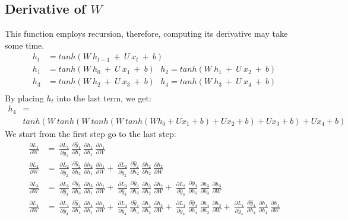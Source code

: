 \documentclass{article}
\begin{document}
\subsection{Derivative of $W$}
This function employs recursion, therefore, computing its derivative may take some time.
\begin{align*}
	h_t &= tanh(W ~h_{t-1}~+~U~x_t ~+~b)\\
	h_1 & = tanh(W ~h_{0}~+~U~x_1 ~+~b) ~~~ h_2 = tanh(W ~h_{1}~+~U~x_2 ~+~b)\\
	h_3 &= tanh(W ~h_{2}~+~U~x_3 ~+~b)~~~h_4 = tanh(W ~h_{3}~+~U~x_4 ~+~b)\\
\end{align*}
By placing $h_t$ into the last term, we get:
\begin{align*}
	h_4 &= \\
	& tanh(W ~tanh(W ~tanh(W ~tanh(W h_{0}+Ux_1 +b)+Ux_2 +b)+Ux_3 +b) +Ux_4 +b)
\end{align*}
We start from the first step go to the last step:
\begin{align*}
\frac{\partial L_1}{ \partial{W}} & = ~\frac{\partial L_1}{ \partial \hat{y}_1}~\frac{\partial \hat{y}_1}{ \partial h_1}
 ~\frac{\partial h_1}{ \partial h_1} ~\frac{\partial h_1}{ \partial W} \\
	\frac{\partial L_2}{ \partial{W}} & = ~\frac{\partial L_2}{ \partial \hat{y}_2}~\frac{\partial \hat{y}_2}{ \partial h_2}
 ~\frac{\partial h_2}{ \partial h_1} ~\frac{\partial h_1}{ \partial W}	+ ~\frac{\partial L_2}{ \partial \hat{y}_2}~\frac{\partial \hat{y}_2}{ \partial h_2}
 ~\frac{\partial h_2}{ \partial h_2} ~\frac{\partial h_2}{ \partial W} \\
 \frac{\partial L_3}{ \partial{W}} & = ~\frac{\partial L_3}{ \partial \hat{y}_3}~\frac{\partial \hat{y}_3}{ \partial h_3}
 ~\frac{\partial h_3}{ \partial h_1} ~\frac{\partial h_1}{ \partial W}	+ ~\frac{\partial L_3}{ \partial \hat{y}_3}~\frac{\partial \hat{y}_3}{ \partial h_3}
 ~\frac{\partial h_3}{ \partial h_2} ~\frac{\partial h_2}{ \partial W} +  ~\frac{\partial L_3}{ \partial \hat{y}_3}~\frac{\partial \hat{y}_3}{ \partial h_3}
 ~\frac{\partial h_3}{ \partial h_3} ~\frac{\partial h_3}{ \partial W} \\
 \frac{\partial L_4}{ \partial{W}} & = ~\frac{\partial L_4}{ \partial \hat{y}_4}~\frac{\partial \hat{y}_4}{ \partial h_4}
 ~\frac{\partial h_4}{ \partial h_1} ~\frac{\partial h_1}{ \partial W}	+ ~\frac{\partial L_4}{ \partial \hat{y}_4}~\frac{\partial \hat{y}_4}{ \partial h_4}
 ~\frac{\partial h_4}{ \partial h_2} ~\frac{\partial h_2}{ \partial W} +  ~\frac{\partial L_4}{ \partial \hat{y}_4}~\frac{\partial \hat{y}_4}{ \partial h_4}
 ~\frac{\partial h_4}{ \partial h_3} ~\frac{\partial h_3}{ \partial W} + ~\frac{\partial L_4}{ \partial \hat{y}_4}~\frac{\partial \hat{y}_4}{ \partial h_4}
 ~\frac{\partial h_4}{ \partial h_4} ~\frac{\partial h_4}{ \partial W}
\end{align*}
\end{document}

